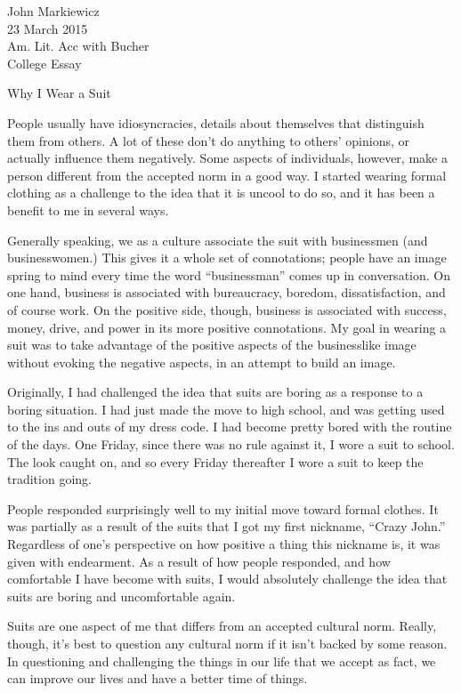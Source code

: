 \documentclass[10pt]{article}
\begin{document}
\begin{raggedleft}
	John Markiewicz\\
	23 March 2015\\ 
	Am. Lit. Acc with Bucher\\
	College Essay\\
\end{raggedleft}
\begin{center}
	Why I Wear a Suit
\end{center}
\doublespacing

	People usually have idiosyncracies, details about themselves
	that distinguish them from others.  A lot of these don't do
	anything to others' opinions, or actually influence them 
	negatively.  Some aspects of individuals, however, make
	a person different from the accepted norm in a good way.  I
	started wearing formal clothing as a challenge to the idea
	that it is uncool to do so, and it has been a benefit to 
	me in several ways.

	Generally speaking, we as a culture associate the suit
	with businessmen (and businesswomen.)  This gives it a whole
	set of connotations; people have an image spring to mind
	every time the word ``businessman'' comes up in conversation.
	On one hand, business is associated with bureaucracy, 
	boredom, dissatisfaction, and of course work.  On the 
	positive side, though, business is associated with success, 
	money, drive, and power in its more positive connotations.
	My goal in wearing a suit was to take advantage of the
	positive aspects of the businesslike image without 
	evoking the negative aspects, in an attempt to build an
	image.

	Originally, I had challenged the idea that suits are boring
	as a response to a boring situation.  I had just made the
	move to high school, and was getting used to the ins and
	outs of my dress code.  I had become pretty bored with the
	routine of the days.  One Friday, since there was no rule
	against it, I wore a suit to school.  The look caught on, 
	and so every Friday thereafter I wore a suit to keep the
	tradition going.

	People responded surprisingly well to my initial move
	toward formal clothes.  It was partially as a result of
	the suits that I got my first nickname, ``Crazy John.''
	Regardless of one's perspective on how positive a thing
	this nickname is, it was given with endearment.  As a 
	result of how people responded, and how comfortable I
	have become with suits, I would absolutely challenge the
	idea that suits are boring and uncomfortable again.

	Suits are one aspect of me that differs from an accepted
	cultural norm.  Really, though, it's best to question any
	cultural norm if it isn't backed by some reason.  In
	questioning and challenging the things in our life that we
	accept as fact, we can improve our lives and have a better
	time of things.
\end{document}
